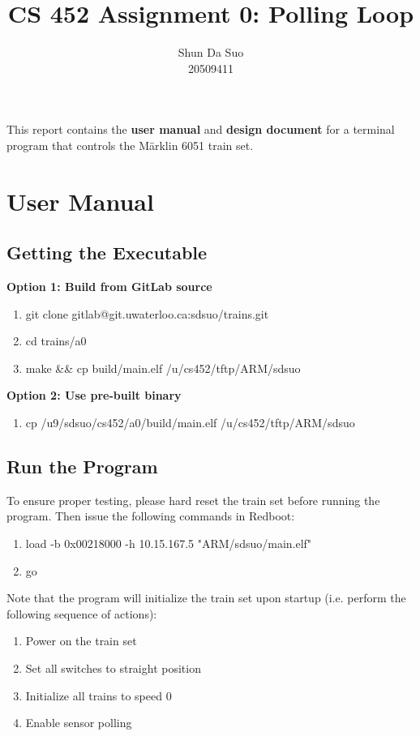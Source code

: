 \documentclass[11pt]{article}
\title{CS 452 Assignment 0: Polling Loop}
\author{
	Shun Da Suo\\
	20509411
}
\begin{document}
\maketitle

\noindent
This report contains the \textbf{user manual} and \textbf{design document} for a terminal program that controls the M\"arklin 6051 train set.

\section{User Manual}
\subsection{Getting the Executable}
\textbf{Option 1: Build from GitLab source}
\begin{enumerate}
	\item git clone gitlab@git.uwaterloo.ca:sdsuo/trains.git
	\item cd trains/a0
	\item make \&\& cp build/main.elf /u/cs452/tftp/ARM/sdsuo
\end{enumerate}
\textbf{Option 2: Use pre-built binary}
\begin{enumerate}
	\item cp /u9/sdsuo/cs452/a0/build/main.elf /u/cs452/tftp/ARM/sdsuo
\end{enumerate}

\subsection{Run the Program}
To ensure proper testing, please hard reset the train set before running the program.
Then issue the following commands in Redboot:
\begin{enumerate}
	\item load -b 0x00218000 -h 10.15.167.5 "ARM/sdsuo/main.elf"
	\item go
\end{enumerate}
Note that the program will initialize the train set upon startup (i.e. perform the following sequence of actions):
\begin{enumerate}
	\item Power on the train set
	\item Set all switches to straight position
	\item Initialize all trains to speed 0
	\item Enable sensor polling
\end{enumerate}
\end{document}
